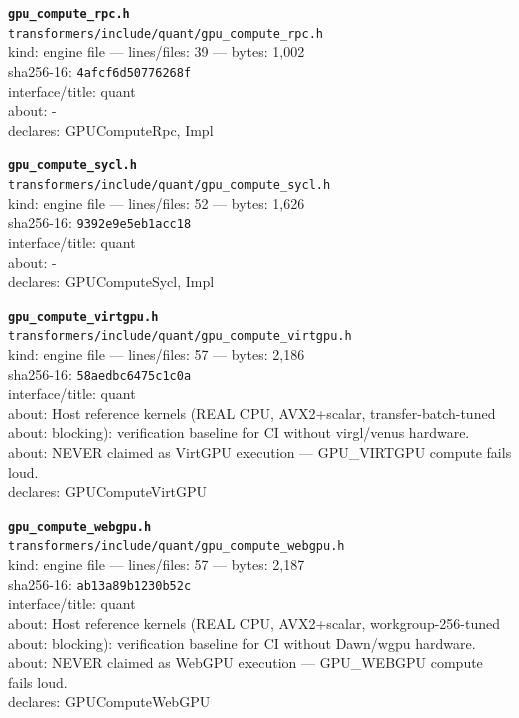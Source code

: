 \noindent\textbf{\texttt{gpu\_compute\_rpc.h}}\\
\texttt{transformers/include/quant/gpu\_compute\_rpc.h}\\
kind: engine file --- lines/files: 39 --- bytes: 1,002\\
sha256-16: \texttt{4afcf6d50776268f}\\
interface/title: quant\\
about: -\\
declares: GPUComputeRpc, Impl\\
\vspace*{6.0pt}

\noindent\textbf{\texttt{gpu\_compute\_sycl.h}}\\
\texttt{transformers/include/quant/gpu\_compute\_sycl.h}\\
kind: engine file --- lines/files: 52 --- bytes: 1,626\\
sha256-16: \texttt{9392e9e5eb1acc18}\\
interface/title: quant\\
about: -\\
declares: GPUComputeSycl, Impl\\
\vspace*{6.0pt}

\noindent\textbf{\texttt{gpu\_compute\_virtgpu.h}}\\
\texttt{transformers/include/quant/gpu\_compute\_virtgpu.h}\\
kind: engine file --- lines/files: 57 --- bytes: 2,186\\
sha256-16: \texttt{58aedbc6475c1c0a}\\
interface/title: quant\\
about: Host reference kernels (REAL CPU, AVX2+scalar, transfer-batch-tuned\\
about: blocking): verification baseline for CI without virgl/venus hardware.\\
about: NEVER claimed as VirtGPU execution — GPU\_VIRTGPU compute fails loud.\\
declares: GPUComputeVirtGPU\\
\vspace*{6.0pt}

\noindent\textbf{\texttt{gpu\_compute\_webgpu.h}}\\
\texttt{transformers/include/quant/gpu\_compute\_webgpu.h}\\
kind: engine file --- lines/files: 57 --- bytes: 2,187\\
sha256-16: \texttt{ab13a89b1230b52c}\\
interface/title: quant\\
about: Host reference kernels (REAL CPU, AVX2+scalar, workgroup-256-tuned\\
about: blocking): verification baseline for CI without Dawn/wgpu hardware.\\
about: NEVER claimed as WebGPU execution — GPU\_WEBGPU compute fails loud.\\
declares: GPUComputeWebGPU\\
\vspace*{6.0pt}
\newpage

